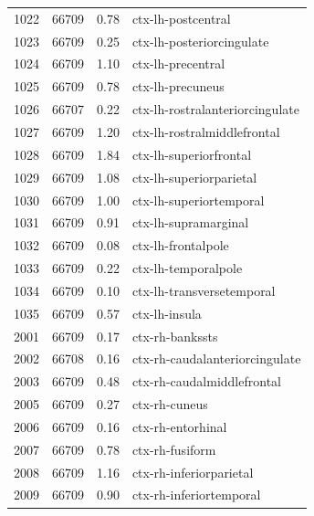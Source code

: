 \documentclass[pdflatex,sn-nature]{sn-jnl}%
\theoremstyle{thmstyleone}%
\theoremstyle{thmstyletwo}%
\theoremstyle{thmstylethree}%
\begin{document}
\begin{appendices}
\begin{small}
\begin{longtable}{r|r|r|l}
   1022 &     66709 &                0.78 &              ctx-lh-postcentral \\
   1023 &     66709 &                0.25 &       ctx-lh-posteriorcingulate \\
   1024 &     66709 &                1.10 &               ctx-lh-precentral \\
   1025 &     66709 &                0.78 &                ctx-lh-precuneus \\
   1026 &     66707 &                0.22 & ctx-lh-rostralanteriorcingulate \\
   1027 &     66709 &                1.20 &     ctx-lh-rostralmiddlefrontal \\
   1028 &     66709 &                1.84 &          ctx-lh-superiorfrontal \\
   1029 &     66709 &                1.08 &         ctx-lh-superiorparietal \\
   1030 &     66709 &                1.00 &         ctx-lh-superiortemporal \\
   1031 &     66709 &                0.91 &            ctx-lh-supramarginal \\
   1032 &     66709 &                0.08 &              ctx-lh-frontalpole \\
   1033 &     66709 &                0.22 &             ctx-lh-temporalpole \\
   1034 &     66709 &                0.10 &       ctx-lh-transversetemporal \\
   1035 &     66709 &                0.57 &                   ctx-lh-insula \\
   2001 &     66709 &                0.17 &                 ctx-rh-bankssts \\
   2002 &     66708 &                0.16 &  ctx-rh-caudalanteriorcingulate \\
   2003 &     66709 &                0.48 &      ctx-rh-caudalmiddlefrontal \\
   2005 &     66709 &                0.27 &                   ctx-rh-cuneus \\
   2006 &     66709 &                0.16 &               ctx-rh-entorhinal \\
   2007 &     66709 &                0.78 &                 ctx-rh-fusiform \\
   2008 &     66709 &                1.16 &         ctx-rh-inferiorparietal \\
   2009 &     66709 &                0.90 &         ctx-rh-inferiortemporal \\

\end{longtable}
\end{small}
\end{appendices}
\end{document}
